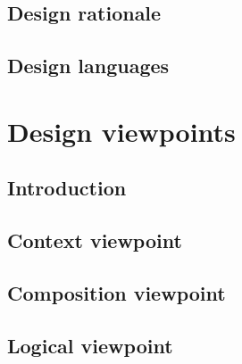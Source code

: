 \documentclass[letterpaper, 10pt, draftclsnofoot, compsoc, onecolumn]{IEEEtran}
\begin{document}
\vspace{1pc}
\subsection{Design rationale}
\vspace{1pc}
{\noindent \par}

\vspace{1pc}
\subsection{Design languages}
\vspace{1pc}
{\noindent \par}






\vspace{1pc}
\section{Design viewpoints}
\vspace{1pc}
{\noindent \par}

\vspace{1pc}
\subsection{Introduction}
\vspace{1pc}
{\noindent \par}

\vspace{1pc}
\subsection{Context viewpoint}
\vspace{1pc}
{\noindent \par}

\vspace{1pc}
\subsection{Composition viewpoint}
\vspace{1pc}
{\noindent \par}

\vspace{1pc}
\subsection{Logical viewpoint}
\vspace{1pc}
{\noindent \par}
\end{document}
